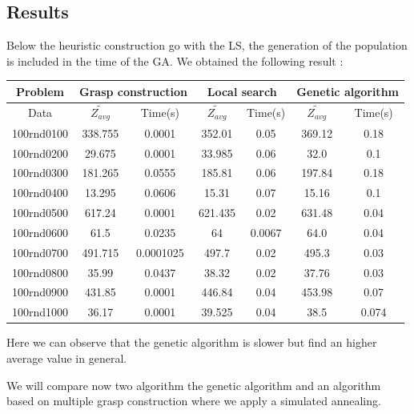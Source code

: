 \documentclass[12pt]{article}
\begin{document}
	\subsection{Results}
	Below the heuristic construction go with the LS, the generation of the population is included in the time of the GA.
	We obtained the following result :
	\begin{center}
		\begin{tabular}{|c|c|c|c|c|c|c|}
			\hline
			Problem  &\multicolumn{2}{|c|}{Grasp construction} & \multicolumn{2}{|c|}{Local search}& \multicolumn{2}{|c|}{Genetic algorithm}\\
			\hline
			Data  &  $\tilde{Z_{avg}}$ & Time(s) & $\tilde{Z_{avg}}$ & Time(s)& $\tilde{Z_{avg}}$ & Time(s) \\
			\hline
			100rnd0100  & 338.755 & 0.0001 &  352.01 & 0.05 & 369.12 & 0.18\\
			\hline
			100rnd0200  & 29.675  &  0.0001 &  33.985 & 0.06 & 32.0 & 0.1\\
			\hline
			100rnd0300  & 181.265   & 0.0555 & 185.81 & 0.06 &197.84 & 0.18\\
			\hline
			100rnd0400 & 13.295    & 0.0606 & 15.31 & 0.07 &15.16&0.1\\
			\hline
			
			100rnd0500  & 617.24     & 0.0001 & 621.435 & 0.02 & 631.48 & 0.04\\
			\hline
			
			100rnd0600  & 61.5     & 0.0235 & 64 & 0.0067 & 64.0 & 0.04\\
			\hline
			
			100rnd0700  & 491.715 & 0.0001025 & 497.7 & 0.02
			& 495.3 & 0.03\\
			\hline
			
			100rnd0800  & 35.99 & 0.0437 &38.32 & 0.02 &37.76& 0.03\\
			\hline
			
			100rnd0900  & 431.85     & 0.0001 & 446.84 & 0.04 &453.98&0.07\\
			\hline
			
			100rnd1000 & 36.17     & 0.0001 & 39.525 & 0.04 &38.5&0.074\\
			\hline
		\end{tabular}
	\end{center}
	Here we can observe that the genetic algorithm is slower but find an higher average value in general.

	We will compare now two algorithm the genetic algorithm and an algorithm based on multiple grasp construction where we apply a simulated annealing.
	
\end{document}
